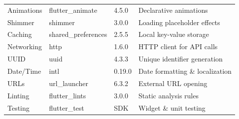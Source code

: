 \documentclass[12pt, a4paper, twoside]{report}
\begin{document}
\begin{table}[ht]
\begin{tabularx}{\textwidth}{lllX}
Animations & flutter\_animate & 4.5.0 & Declarative animations \\
Shimmer & shimmer & 3.0.0 & Loading placeholder effects \\
\addlinespace
Caching & shared\_preferences & 2.5.5 & Local key-value storage \\
Networking & http & 1.6.0 & HTTP client for API calls \\
UUID & uuid & 4.3.3 & Unique identifier generation \\
Date/Time & intl & 0.19.0 & Date formatting \& localization \\
URLs & url\_launcher & 6.3.2 & External URL opening \\
\addlinespace
Linting & flutter\_lints & 3.0.0 & Static analysis rules \\
Testing & flutter\_test & SDK & Widget \& unit testing \\
\bottomrule
\end{tabularx}
\end{table}
\end{document}
